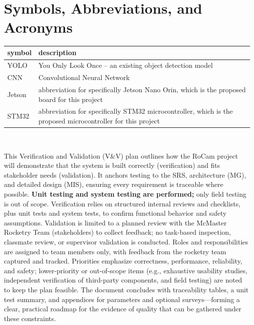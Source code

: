 \documentclass[12pt, titlepage]{article}
\begin{document}
~\\

\newpage

\tableofcontents

\section{Symbols, Abbreviations, and Acronyms}

\renewcommand{\arraystretch}{1.2}
\begin{tabular}{l l}
  \toprule
  \textbf{symbol} & \textbf{description}                                              \\
  \midrule
  YOLO            & You Only Look Once -- an existing object detection model          \\
  CNN             & Convolutional Neural Network                                      \\
  Jetson          & abbreviation for specifically Jetson Nano Orin, which is the
  proposed board for this project
  \\
  STM32           & abbreviation for specifically STM32 microcontroller, which is the
  proposed microcontroller for this project                                           \\

  \bottomrule
\end{tabular}\\

\newpage


This Verification and Validation (V\&V) plan outlines how the RoCam project
will demonstrate that the system is built correctly (verification) and fits
stakeholder needs (validation). It anchors testing to the SRS, architecture
(MG), and detailed design (MIS), ensuring every requirement is traceable where
possible. \textbf{Unit testing and system testing are performed;} only field
testing is out of scope. Verification relies on structured internal reviews and
checklists, plus unit tests and system tests, to confirm functional behavior
and safety assumptions. Validation is limited to a planned review with the
McMaster Rocketry Team (stakeholders) to collect feedback; no task-based
inspection, classmate review, or supervisor validation is conducted. Roles and
responsibilities are assigned to team members only, with feedback from the
rocketry team captured and tracked. Priorities emphasize correctness,
performance, reliability, and safety; lower-priority or out-of-scope items
(e.g., exhaustive usability studies, independent verification of third-party
components, and field testing) are noted to keep the plan feasible. The
document concludes with traceability tables, a unit test summary, and
appendices for parameters and optional surveys---forming a clear, practical
roadmap for the evidence of quality that can be gathered under these
constraints.
\end{document}
